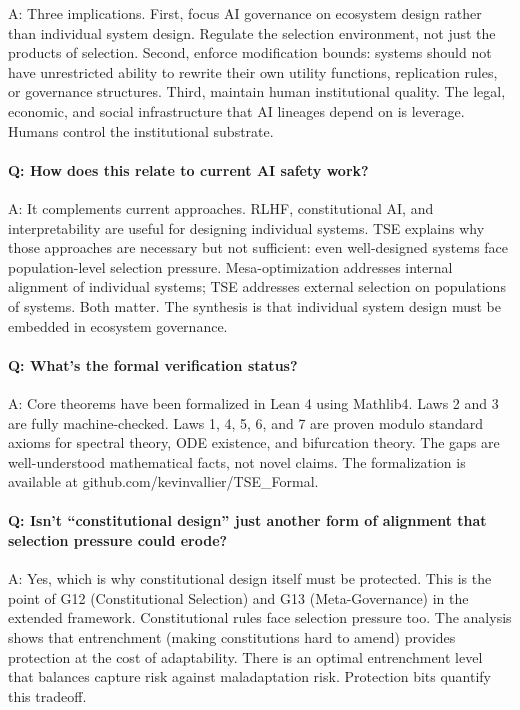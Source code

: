 \documentclass[12pt]{article}
\begin{document}
A: Three implications. First, focus AI governance on ecosystem design rather than individual system design. Regulate the selection environment, not just the products of selection. Second, enforce modification bounds: systems should not have unrestricted ability to rewrite their own utility functions, replication rules, or governance structures. Third, maintain human institutional quality. The legal, economic, and social infrastructure that AI lineages depend on is leverage. Humans control the institutional substrate.

\paragraph{Q: How does this relate to current AI safety work?}

A: It complements current approaches. RLHF, constitutional AI, and interpretability are useful for designing individual systems. TSE explains why those approaches are necessary but not sufficient: even well-designed systems face population-level selection pressure. Mesa-optimization addresses internal alignment of individual systems; TSE addresses external selection on populations of systems. Both matter. The synthesis is that individual system design must be embedded in ecosystem governance.

\paragraph{Q: What's the formal verification status?}

A: Core theorems have been formalized in Lean 4 using Mathlib4. Laws 2 and 3 are fully machine-checked. Laws 1, 4, 5, 6, and 7 are proven modulo standard axioms for spectral theory, ODE existence, and bifurcation theory. The gaps are well-understood mathematical facts, not novel claims. The formalization is available at github.com/kevinvallier/TSE\_Formal.

\paragraph{Q: Isn't ``constitutional design'' just another form of alignment that selection pressure could erode?}

A: Yes, which is why constitutional design itself must be protected. This is the point of G12 (Constitutional Selection) and G13 (Meta-Governance) in the extended framework. Constitutional rules face selection pressure too. The analysis shows that entrenchment (making constitutions hard to amend) provides protection at the cost of adaptability. There is an optimal entrenchment level that balances capture risk against maladaptation risk. Protection bits quantify this tradeoff.
\end{document}

